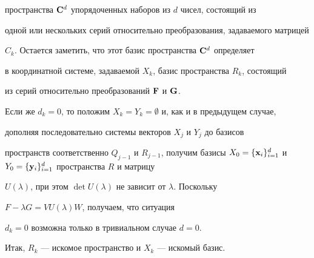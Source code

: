 \begin{pf}
пространства $\bold C^d$ упорядоченных наборов из $d$ чисел, состоящий из 


одной или нескольких серий относительно преобразования, задаваемого матрицей 


$C_k$. Остается заметить, что этот базис пространства $\bold C^d$ определяет 


в координатной системе, задаваемой $X_k$, базис пространства $R_k$, состоящий 


из серий относительно преобразований $\bold F$ и $\bold G$. 


 


Если же $d_k=0$, то положим $X_k=Y_k=\emptyset$ и, как и в предыдущем случае, 


дополняя последовательно системы векторов $X_j$ и $Y_j$ до базисов 


пространств соответственно $Q_{j-1}$ и $R_{j-1}$, получим базисы $X_0=\{\bold 


x_i\}^d_{i=1}$ и $Y_0=\{\bold y_i\}^d_{i=1}$ пространства $R$ и матрицу 


$U(\lambda)$, при этом $\det U(\lambda)$ не зависит от $\lambda$. Поскольку 


$F-\lambda G=V U(\lambda)W$, получаем, что ситуация 


$d_k=0$ возможна только в тривиальном случае $d=0$. 


 


Итак, $R_k$ --- искомое пространство и $X_k$ --- искомый базис. 


\end{pf} 


 


